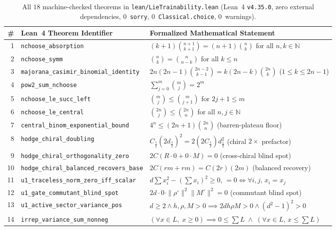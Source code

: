 \documentclass[11pt,a4paper]{article}
\theoremstyle{definition}
\theoremstyle{remark}
\newcommand{\NN}{\mathbb{N}}
\begin{document}
\begin{table}[t]
\centering
\caption{All $18$ machine-checked theorems in \texttt{lean/LieTrainability.lean} (Lean~4 \texttt{v4.35.0}, zero external dependencies, $0$~\texttt{sorry}, $0$~\texttt{Classical.choice}, $0$~warnings).}
\label{tab:lean}
\footnotesize
\setlength{\tabcolsep}{5pt}
\begin{tabular}{@{}rll@{}}
\toprule
\# & Lean~4 Theorem Identifier & Formalized Mathematical Statement \\
\midrule
1 & \texttt{nchoose\_absorption} & $(k+1)\binom{n+1}{k+1} = (n+1)\binom{n}{k}$ for all $n,k \in \NN$ \\
2 & \texttt{nchoose\_symm} & $\binom{n}{k} = \binom{n}{n-k}$ for all $k \le n$ \\
3 & \texttt{majorana\_casimir\_binomial\_identity} & $2n(2n-1)\binom{2n-2}{k-1} = k(2n-k)\binom{2n}{k}$ ($1 \le k \le 2n-1$) \\
4 & \texttt{pow2\_sum\_nchoose} & $\sum_{j=0}^{m} \binom{m}{j} = 2^m$ \\
5 & \texttt{nchoose\_le\_succ\_left} & $\binom{m}{j} \le \binom{m}{j+1}$ for $2j+1 \le m$ \\
6 & \texttt{nchoose\_le\_central} & $\binom{2n}{j} \le \binom{2n}{n}$ for all $n,j \in \NN$ \\
7 & \texttt{central\_binom\_exponential\_bound} & $4^n \le (2n+1)\binom{2n}{n}$ (barren-plateau floor) \\
8 & \texttt{hodge\_chiral\_doubling} & $C_{\frac{1}{2}}(2d_{\frac{1}{2}})^2 = 2(2C_{\frac{1}{2}})d_{\frac{1}{2}}^2$ (chiral $2\times$ prefactor) \\
9 & \texttt{hodge\_chiral\_orthogonality\_zero} & $2C(R\cdot 0 + 0\cdot M) = 0$ (cross-chiral blind spot) \\
10 & \texttt{hodge\_chiral\_balanced\_recovers\_base} & $2C(rm + rm) = C(2r)(2m)$ (balanced recovery) \\
11 & \texttt{u1\_traceless\_norm\_zero\_iff\_scalar} & $d\sum x_i^2 - (\sum x_i)^2 \ge 0$, $=0 \iff \forall i,j,\, x_i = x_j$ \\
12 & \texttt{u1\_gate\_commutant\_blind\_spot} & $2d\cdot 0\cdot \|\rho^\circ\|^2 \|M^\circ\|^2 = 0$ (commutant blind spot) \\
13 & \texttt{u1\_active\_sector\_variance\_pos} & $d\ge 2 \wedge h,\rho,M>0 \implies 2dh\rho M>0 \wedge (d^2-1)^2>0$ \\
14 & \texttt{irrep\_variance\_sum\_nonneg} & $(\forall x \in L,\; x \ge 0) \implies 0 \le \sum L \;\wedge\; (\forall x \in L,\, x \le \sum L)$ \\

\end{tabular}
\end{table}
\end{document}
